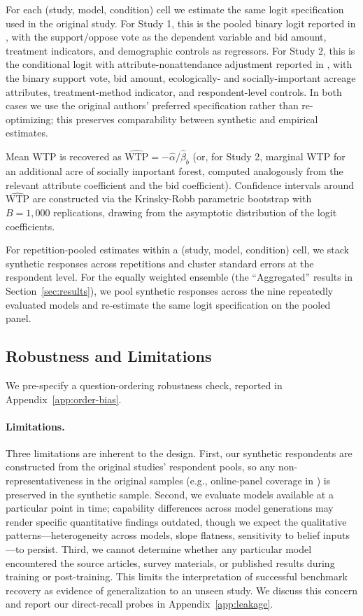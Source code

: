 \documentclass[12pt]{article}
\begin{document}
For each (study, model, condition) cell we estimate the same logit
specification used in the original study. For Study 1, this is the pooled
binary logit reported in \textcite{Aldy2012}, with the support/oppose vote
as the dependent variable and bid amount, treatment indicators, and
demographic controls as regressors. For Study 2, this is the conditional
logit with attribute-nonattendance adjustment reported in
\textcite{Giguere2020}, with the binary support vote, bid amount,
ecologically- and socially-important acreage attributes, treatment-method
indicator, and respondent-level controls. In both cases we use the
original authors' preferred specification rather than re-optimizing; this
preserves comparability between synthetic and empirical estimates.

Mean WTP is recovered as $\widehat{\text{WTP}} = -\hat{\alpha}/\hat{\beta}_b$
(or, for Study 2, marginal WTP for an additional acre of socially important
forest, computed analogously from the relevant attribute coefficient and
the bid coefficient). Confidence intervals around $\widehat{\text{WTP}}$
are constructed via the Krinsky-Robb parametric bootstrap with
$B = 1{,}000$ replications, drawing from the asymptotic
distribution of the logit coefficients.

For repetition-pooled estimates within a (study, model, condition) cell,
we stack synthetic responses across repetitions and cluster standard
errors at the respondent level. For the equally weighted ensemble (the ``Aggregated'' results in
Section~\ref{sec:results}), we pool synthetic responses across the nine
repeatedly evaluated models and re-estimate the same logit specification
on the pooled panel.

\subsection{Robustness and Limitations}\label{sec:methods-robustness}

We pre-specify a question-ordering robustness check, reported in Appendix~\ref{app:order-bias}.

\paragraph{Limitations.} Three limitations are inherent to the design.
First, our synthetic respondents are constructed from the original
studies' respondent pools, so any non-representativeness in the original
samples (e.g., online-panel coverage in \textcite{Giguere2020}) is
preserved in the synthetic sample. Second, we evaluate models available
at a particular point in time; capability differences across model
generations may render specific quantitative findings outdated, though
we expect the qualitative patterns---heterogeneity across models, slope
flatness, sensitivity to belief inputs---to persist. Third, we cannot determine whether any particular model encountered the
source articles, survey materials, or published results during training
or post-training. This limits the interpretation of successful benchmark
recovery as evidence of generalization to an unseen study. We discuss this concern and report our direct-recall probes in Appendix~\ref{app:leakage}.
\end{document}
